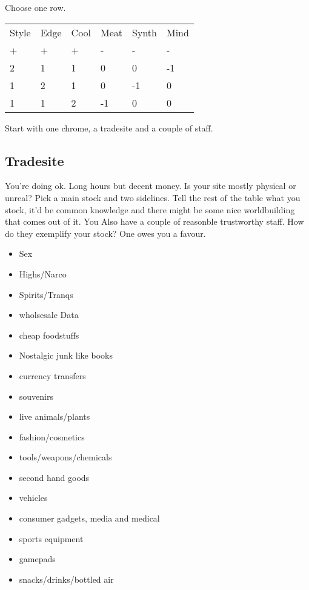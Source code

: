 \documentclass{tufte-book}
\begin{document}
Choose one row.
\begin{table}[ht]
\centering
{}\selectfont
\begin{tabular}{llllll}
\toprule
Style & Edge & Cool & Meat & Synth & Mind\\
+&+&+&-&-&-\\
\midrule
2&1&1&0&0&-1\\
1&2&1&0&-1&0\\
1&1&2&-1&0&0\\
\bottomrule
\end{tabular}
\end{table}

Start with one chrome, a tradesite and a couple of staff.

\subsection{Tradesite}
You're doing ok. Long hours but decent money. Is your site mostly physical or unreal? Pick a main stock and two sidelines.
Tell the rest of the table what you stock, it'd be common knowledge and there might be some nice worldbuilding that comes out of it.
 You Also have a couple of reasonble trustworthy staff. How do they exemplify your stock? One owes you a favour.

\begin{multicols}{3}
\begin{itemize}
\item Sex
\item Highs/Narco
\item Spirits/Tranqs
\item wholsesale Data
\item cheap foodstuffs
\item Nostalgic junk like books
\item currency transfers
\item souvenirs
\item live animals/plants
\item fashion/cosmetics
\item tools/weapons/chemicals
\item second hand goods
\item vehicles
\item consumer gadgets, media and medical
\item sports equipment
\item gamepads
\item snacks/drinks/bottled air
\end{itemize}
\end{multicols}
\end{document}
